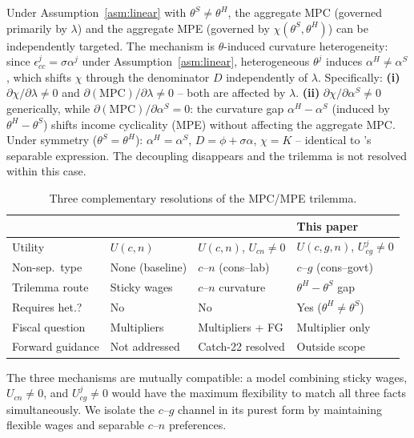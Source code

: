 \begin{proposition}
\label{prop:mpc-mpe-decoupling}
Under Assumption~\ref{asm:linear} with $\theta^{S}\neq\theta^{H}$, the
aggregate MPC (governed primarily by $\lambda$) and the aggregate MPE (governed
by $\chi(\theta^{S},\theta^{H})$) can be independently targeted. The mechanism
is $\theta$-induced curvature heterogeneity: since $\epsilon^{j}_{cc}=\sigma\alpha^{j}$
under Assumption~\ref{asm:linear}, heterogeneous $\theta^{j}$ induces
$\alpha^{H}\neq\alpha^{S}$, which shifts $\chi$ through the denominator $D$
independently of $\lambda$. Specifically:
\textbf{(i)} $\partial\chi/\partial\lambda\neq 0$ and
$\partial(\mathrm{MPC})/\partial\lambda\neq 0$ -- both are affected by $\lambda$.
\textbf{(ii)} $\partial\chi/\partial\alpha^{S}\neq 0$ generically, while
$\partial(\mathrm{MPC})/\partial\alpha^{S}=0$: the curvature gap
$\alpha^{H}-\alpha^{S}$ (induced by $\theta^{H}-\theta^{S}$) shifts income
cyclicality (MPE) without affecting the aggregate MPC.
Under symmetry ($\theta^{S}=\theta^{H}$): $\alpha^{H}=\alpha^{S}$,
$D=\phi+\sigma\alpha$, $\chi=K$ -- identical to \bilbiie{}'s separable
expression. The decoupling disappears and the trilemma is not resolved within
this case.
\end{proposition}

\begin{table}[ht]
\centering
\small
\caption{Three complementary resolutions of the MPC/MPE trilemma.}
\label{tab:trilemma-comparison}
\begin{threeparttable}
\begin{tabular}{@{}p{2.8cm}p{3.0cm}p{3.4cm}p{3.4cm}@{}}
\toprule
 & \citet{Auclert2024} & \BHL{} & \textbf{This paper} \\
\midrule
Utility & $U(c,n)$ & $U(c,n)$, $U_{cn}\neq 0$ & $U(c,g,n)$, $U_{cg}^{j}\neq 0$ \\[3pt]
Non-sep.\ type & None (baseline) & $c$--$n$ (cons--lab) & $c$--$g$ (cons--govt) \\[3pt]
Trilemma route & Sticky wages & $c$--$n$ curvature & $\theta^{H}-\theta^{S}$ gap \\[3pt]
Requires het.?  & No & No & Yes ($\theta^{H}\neq\theta^{S}$) \\[3pt]
Fiscal question & Multipliers & Multipliers + FG & Multiplier only \\[3pt]
Forward guidance & Not addressed & Catch-22 resolved & Outside scope \\
\bottomrule
\end{tabular}
\begin{tablenotes}\footnotesize
\item The three mechanisms are mutually compatible: a model combining sticky
wages, $U_{cn}\neq 0$, and $U_{cg}^{j}\neq 0$ would have the maximum flexibility
to match all three facts simultaneously. We isolate the $c$--$g$ channel in its
purest form by maintaining flexible wages and separable $c$--$n$ preferences.
\end{tablenotes}
\end{threeparttable}
\end{table}

